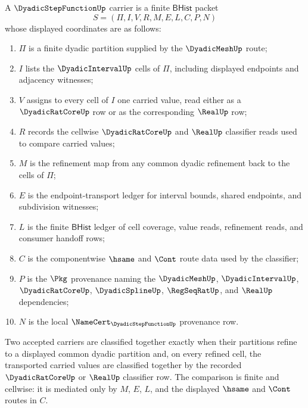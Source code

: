 \begin{definition}
\label{def:dyadic-step-function-carrier}
A $\DyadicStepFunctionUp$ carrier is a finite $\mathsf{BHist}$ packet
$$
S=(\Pi,I,V,R,M,E,L,C,P,N)
$$
whose displayed coordinates are as follows:
\begin{enumerate}
\item $\Pi$ is a finite dyadic partition supplied by the $\DyadicMeshUp$ route;
\item $I$ lists the $\DyadicIntervalUp$ cells of $\Pi$, including displayed endpoints and adjacency witnesses;
\item $V$ assigns to every cell of $I$ one carried value, read either as a $\DyadicRatCoreUp$ row or as the corresponding $\RealUp$ row;
\item $R$ records the cellwise $\DyadicRatCoreUp$ and $\RealUp$ classifier reads used to compare carried values;
\item $M$ is the refinement map from any common dyadic refinement back to the cells of $\Pi$;
\item $E$ is the endpoint-transport ledger for interval bounds, shared endpoints, and subdivision witnesses;
\item $L$ is the finite $\mathsf{BHist}$ ledger of cell coverage, value reads, refinement reads, and consumer handoff rows;
\item $C$ is the componentwise $\hsame$ and $\Cont$ route data used by the classifier;
\item $P$ is the $\Pkg$ provenance naming the $\DyadicMeshUp$, $\DyadicIntervalUp$, $\DyadicRatCoreUp$, $\DyadicSplineUp$, $\RegSeqRatUp$, and $\RealUp$ dependencies;
\item $N$ is the local $\NameCert_{\DyadicStepFunctionUp}$ provenance row.
\end{enumerate}
Two accepted carriers are classified together exactly when their partitions refine to a displayed common dyadic partition and, on every refined cell, the transported carried values are classified together by the recorded $\DyadicRatCoreUp$ or $\RealUp$ classifier row. The comparison is finite and cellwise: it is mediated only by $M$, $E$, $L$, and the displayed $\hsame$ and $\Cont$ routes in $C$.
\end{definition}

